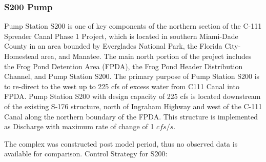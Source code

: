 %
%


\clearpage

\subsubsection{S200 Pump}
Pump Station S200 is one of key components of the northern section of the C-111 Spreader Canal Phase 1 Project, which is located in southern Miami-Dade County in an area bounded by Everglades National Park, the Florida City-Homestead area, and Manatee. The main north portion of the project includes the Frog Pond Detention Area (FPDA), the Frog Pond Header Distribution Channel, and Pump Station S200. The primary purpose of Pump Station S200 is to re-direct to the west up to 225 cfs of excess water from C111 Canal into FPDA. Pump Station S200 with design capacity of 225 cfs is located downstream of the existing S-176 structure, north of Ingraham Highway and west of the C-111 Canal along the northern boundary of the FPDA. This structure is implemented as Discharge with maximum rate of change of 1 $cfs/s$.

The complex was constructed post model period, thus no observed data is available for comparison.
Control Strategy for S200:

